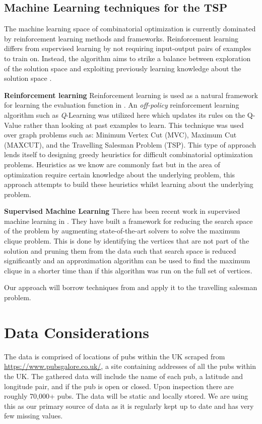 \documentclass[]{UCD_CS_FYP_Report}
\begin{document}
\section{Machine Learning techniques for the TSP}
The machine learning space of combinatorial optimization is currently dominated by reinforcement learning methods and frameworks. Reinforcement learning differs from supervised learning by not requiring input-output pairs of examples to train on. Instead, the algorithm aims to strike a balance between exploration of the solution space and exploiting previously learning knowledge about the solution space \cite{ReinforcementLearning}.

\textbf{Reinforcement learning}
Reinforcement learning is used as a natural framework for learning the evaluation function in \cite{DBLP:journals/corr/DaiKZDS17}. An \textit{off-policy} reinforcement learning algorithm such as \textit{Q}-Learning was utilized here which updates its rules on the Q-Value rather than looking at past examples to learn. This technique was used over graph problems such as: Minimum Vertex Cut (MVC), Maximum Cut (MAXCUT), and the Travelling Salesman Problem (TSP). This type of approach lends itself to designing greedy heuristics for difficult combinatorial optimization problems. Heuristics as we know are commonly fast but in the area of optimization require certain knowledge about the underlying problem, this approach attempts to build these heuristics whilst learning about the underlying problem.

\textbf{Supervised Machine Learning}
There has been recent work in supervised machine learning in \cite{iAAA}. They have built a framework for reducing the search space of the problem by augmenting state-of-the-art solvers to solve the maximum clique problem. This is done by identifying the vertices that are not part of the solution and pruning them from the data such that search space is reduced significantly and an approximation algorithm can be used to find the maximum clique in a shorter time than if this algorithm was run on the full set of vertices.

Our approach will borrow techniques from \cite{iAAA} and apply it to the travelling salesman problem.




\chapter{Data Considerations}
The data is comprised of locations of pubs within the UK scraped from \url{https://www.pubsgalore.co.uk/}, a site containing addresses of all the pubs within the UK. The gathered data will include the name of each pub, a latitude  and longitude pair, and if the pub is open or closed.  Upon inspection there are roughly 70,000+ pubs. The data will be static and locally stored. We are using this as our primary source of data as it is regularly kept up to date and has very few missing values.
\end{document}

